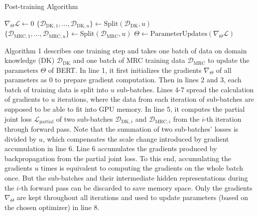 \begin{algorithm}
\label{chap4:alg:post-training}
\LinesNumbered
\DontPrintSemicolon
\caption{Post-training Algorithm}
\BlankLine
$\nabla_\Theta \mathcal{L} \gets 0 $ \;
$\{\mathcal{D}_{\text{DK}, 1}, \dots, \mathcal{D}_{\text{DK}, u} \} \gets \text{Split}(\mathcal{D}_\text{DK}, u) $ \;
$\{\mathcal{D}_{\text{MRC}, 1}, \dots, \mathcal{D}_{\text{MRC}, u} \} \gets \text{Split}(\mathcal{D}_\text{MRC}, u) $ \;
$\Theta \gets \text{ParameterUpdates}(\nabla_\Theta \mathcal{L}) $ \;
\end{algorithm}

Algorithm 1 describes one training step and takes one batch of data on domain knowledge (DK) $\mathcal{D}_\text{DK}$ and one batch of MRC training data $\mathcal{D}_\text{MRC}$ to update the parameters $\Theta$ of BERT.
In line 1, it first initializes the gradients $\nabla_\Theta$ of all parameters as 0 to prepare gradient computation. Then in lines 2 and 3, each batch of training data is split into $u$ sub-batches. Lines 4-7 spread the calculation of gradients to $u$ iterations, where the data from each iteration of sub-batches are supposed to be able to fit into GPU memory.
In line 5, it computes the partial joint loss $\mathcal{L}_\text{partial}$ of two sub-batches $\mathcal{D}_{\text{DK}, i}$ and $\mathcal{D}_{\text{MRC}, i}$ from the $i$-th iteration through forward pass.
Note that the summation of two sub-batches' losses is divided by $u$, which compensates the scale change introduced by gradient accumulation in line 6.
Line 6 accumulates the gradients produced by backpropagation from the partial joint loss. To this end, accumulating the gradients $u$ times is equivalent to computing the gradients on the whole batch once. But the sub-batches and their intermediate hidden representations during the $i$-th forward pass can be discarded to save memory space.
Only the gradients $\nabla_\Theta$ are kept throughout all iterations and used to update parameters (based on the chosen optimizer) in line 8.

